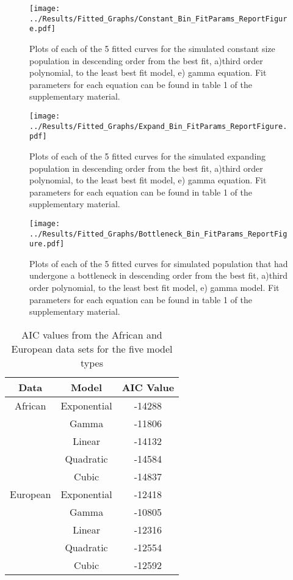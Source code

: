 \documentclass[11pt]{article}
\begin{document}
\begin{linenumbers}
\begin{figure}[htp]
\begin{center}
\texttt{[image: ../Results/Fitted\_Graphs/Constant\_Bin\_FitParams\_ReportFigure.pdf]}
\caption{\small Plots of each of the 5 fitted curves for the simulated constant size population in descending order from the best fit, a)third order polynomial, to the least best fit model, e) gamma equation. Fit parameters for each equation can be found in table 1 of the supplementary material.}
\end{center}
\end{figure}

\begin{figure}[htp]
\begin{center}
\texttt{[image: ../Results/Fitted\_Graphs/Expand\_Bin\_FitParams\_ReportFigure.pdf]}
\caption{\small Plots of each of the 5 fitted curves for the simulated expanding population in descending order from the best fit, a)third order polynomial, to the least best fit model, e) gamma equation. Fit parameters for each equation can be found in table 1 of the supplementary material.}
\end{center}
\end{figure}

\begin{figure}[htp]
\begin{center}
\texttt{[image: ../Results/Fitted\_Graphs/Bottleneck\_Bin\_FitParams\_ReportFigure.pdf]}
\caption{\small Plots of each of the 5 fitted curves for simulated population that had undergone a bottleneck in descending order from the best fit, a)third order polynomial, to the least best fit model, e) gamma model. Fit parameters for each equation can be found in table 1 of the supplementary material.}
\end{center}
\end{figure}

\begin{table}[htp]
\centering
\caption{AIC values from the African and European data sets for the five model types}
\label{table:1}
\begin{tabular}{c  c  c}
\hline
Data     & Model       & AIC Value \\
\hline
African  & Exponential & -14288    \\
         & Gamma       & -11806    \\
         & Linear      & -14132    \\
         & Quadratic   & -14584    \\
         & Cubic       & -14837    \\
\hline         
European & Exponential & -12418    \\
         & Gamma       & -10805    \\
         & Linear      & -12316    \\
         & Quadratic   & -12554    \\
         & Cubic       & -12592    \\
\hline


\end{tabular}
\end{table}
\end{linenumbers}
\end{document}
